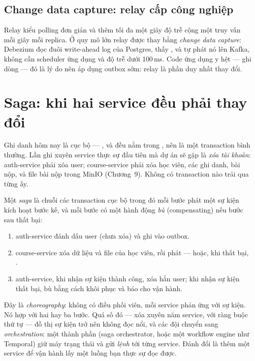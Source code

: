 \subsection{Change data capture: relay cấp công nghiệp}

Relay kiểu polling đơn giản và thêm tối đa một giây độ trễ cộng một
truy vấn mỗi giây mỗi replica. Ở quy mô lớn relay được thay bằng
\emph{change data capture}: Debezium đọc đuôi write-ahead log của
Postgres, thấy , và tự phát nó lên Kafka,
không cần scheduler ứng dụng và độ trễ dưới 100\,ms. Code ứng dụng y
hệt --- ghi dòng --- đó là lý do nên áp dụng outbox sớm: relay là phần
duy nhất thay đổi.

\section{Saga: khi hai service đều phải thay đổi}

Ghi danh hôm nay là cục bộ --- ,  và
 đều nằm trong , nên
 là một transaction bình thường. Lần ghi
xuyên service thực sự đầu tiên mà dự án sẽ gặp là \emph{xóa tài
khoản}: auth-service phải xóa user; course-service phải xóa học viên,
các ghi danh, bài nộp, và file bài nộp trong MinIO (Chương~9). Không
có transaction nào trải qua từng ấy.

Một \emph{saga} là chuỗi các transaction cục bộ trong đó mỗi bước phát
một sự kiện kích hoạt bước kế, và mỗi bước có một hành động \emph{bù}
(compensating) nếu bước sau thất bại:

\begin{enumerate}
  \item auth-service đánh dấu user  (chưa xóa) và ghi
   vào outbox.
  \item course-service xóa dữ liệu và file của học viên, rồi phát
   --- hoặc, khi thất bại,
  .
  \item auth-service, khi nhận sự kiện thành công, xóa hẳn user; khi
  nhận sự kiện thất bại, bù bằng cách khôi phục  và báo
  cho vận hành.
\end{enumerate}

Đây là \emph{choreography}: không có điều phối viên, mỗi service phản
ứng với sự kiện. Nó hợp với hai hay ba bước. Quá số đó --- xóa xuyên
năm service, với ràng buộc thứ tự --- đồ thị sự kiện trở nên không đọc
nổi, và các đội chuyển sang \emph{orchestration}: một thành phần (saga
orchestrator, hoặc một workflow engine như Temporal) giữ máy trạng thái
và gửi \emph{lệnh} tới từng service. Đánh đổi là thêm một service để
vận hành lấy một luồng bạn thực sự đọc được.

